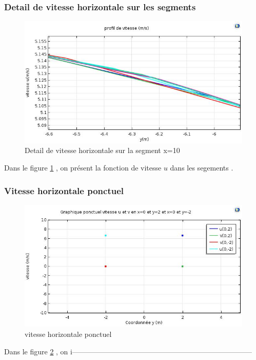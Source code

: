 \documentclass[a4paper,11pt]{report} %
\begin{document}
\subsubsection{Detail de vitesse horizontale sur les segments }
\begin{figure}[!h]
\centering
\hspace*{0mm}\vfill
\begin{center} \includegraphics[width=1.\textwidth]{u_seg_detail.jpg} \end{center}
\vfill\hspace*{0mm}
\caption{Detail de vitesse horizontale sur la segment x=10}
\label{detail_vitesse_u_seg}
\end{figure}\pagebreak
Dans le figure \ref{detail_vitesse_u_seg} , on présent la fonction de vitesse $u$ dans les segements . 

\subsubsection{Vitesse horizontale ponctuel }
\begin{figure}[!h]
\centering
\hspace*{0mm}\vfill
\begin{center} \includegraphics[width=1.\textwidth]{u_v_ponctuel.jpg} \end{center}
\vfill\hspace*{0mm}
\caption{vitesse horizontale ponctuel}
\label{u_ponctuel}
\end{figure}\pagebreak
Dans le figure \ref{u_ponctuel} , on i---------------------------------------------------------------------------
\end{document}
